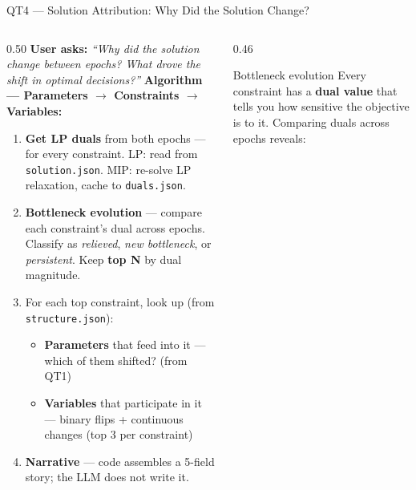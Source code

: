 \documentclass[aspectratio=169,10pt]{beamer}
\begin{document}
\begin{frame}[t]{QT4 — Solution Attribution: Why Did the Solution Change?}
\vspace{2pt}
\begin{columns}[T]
  \begin{column}{0.50\textwidth}
    \small\textbf{User asks:}
    \emph{``Why did the solution change between epochs?
    What drove the shift in optimal decisions?''}
    \vspace{5pt}
    \textbf{Algorithm — Parameters $\to$ Constraints $\to$ Variables:}
    \begin{enumerate}\setlength\itemsep{3pt}
      \item \textbf{Get LP duals} from both epochs — for
            every constraint.
            LP: read from \texttt{solution.json}.
            MIP: re-solve LP relaxation, cache to
            \texttt{duals.json}.
      \item \textbf{Bottleneck evolution} — compare each
            constraint's dual across epochs. Classify as
            \emph{relieved}, \emph{new bottleneck}, or
            \emph{persistent}. Keep \textbf{top N} by
            dual magnitude.
      \item For each top constraint, look up
            (from \texttt{structure.json}):
            \begin{itemize}\setlength\itemsep{1pt}
              \item[\textcolor{aorng}{$\uparrow$}]
                    \textbf{Parameters} that feed into it
                    — which of them shifted? (from QT1)
              \item[\textcolor{purp}{$\downarrow$}]
                    \textbf{Variables} that participate in it
                    — binary flips + continuous changes
                    (top 3 per constraint)
            \end{itemize}
      \item \textbf{Narrative} — code assembles a
            5-field story; the LLM does not write it.
    \end{enumerate}
  \end{column}
  \begin{column}{0.46\textwidth}
    \begin{block}{Bottleneck evolution}
      \small
      Every constraint has a \textbf{dual value} that
      tells you how sensitive the objective is to it.
      Comparing duals across epochs reveals:\\[4pt]

\end{block}
\end{column}
\end{columns}
\end{frame}
\end{document}
